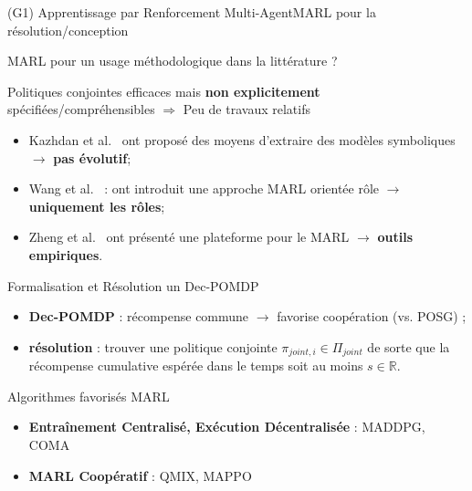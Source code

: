 \begin{frame}{(G1) Apprentissage par Renforcement Multi-Agent}{MARL pour la résolution/conception}

    \begin{block}{MARL pour un usage méthodologique dans la littérature ?}

        Politiques conjointes efficaces mais \textbf{non explicitement} spécifiées/compréhensibles
        $\Longrightarrow$ Peu de travaux relatifs
            {\small
                \begin{itemize}
                    \item Kazhdan et al.~\parencite{Kazhdan2020} ont proposé des moyens d'extraire des modèles symboliques $\rightarrow$ \textbf{pas évolutif};
                    \item Wang et al.~\parencite{Wang2020} : ont introduit une approche MARL orientée rôle $\rightarrow$ \textbf{uniquement les rôles};
                    \item Zheng et al.~\parencite{Zheng2018} ont présenté une plateforme pour le MARL $\rightarrow$ \textbf{outils empiriques}.
                \end{itemize}
            }
    \end{block}

    \begin{block}{Formalisation et Résolution un Dec-POMDP}

        \begin{itemize}
            \item \textbf{Dec-POMDP} : récompense commune $\rightarrow$ favorise coopération (vs. POSG) ;
            \item \textbf{résolution} : trouver une politique conjointe $\pi_{joint,i} \in \Pi_{joint}$ de sorte que la récompense cumulative espérée dans le temps soit au moins $s \in \mathbb{R}$.
        \end{itemize}


    \end{block}

    \begin{exampleblock}{Algorithmes favorisés MARL}
        {\footnotesize

            \centering
            \begin{minipage}{0.5\textwidth}
                \centering
                \begin{itemize}
                    \item \textbf{Entraînement Centralisé, Exécution Décentralisée} : MADDPG, COMA
                \end{itemize}
            \end{minipage}\hfill
            \begin{minipage}{0.5\textwidth}
                \centering
                \begin{itemize}
                    \item \textbf{MARL Coopératif} : QMIX, MAPPO
                \end{itemize}
            \end{minipage}\hfill
        }
    \end{exampleblock}


\end{frame}
